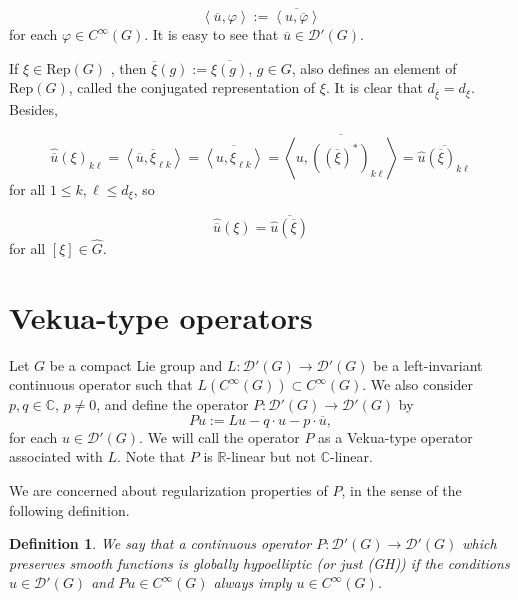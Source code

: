 \documentclass[sn-mathphys-num]{sn-jnl}%
\numberwithin{equation}{section}
\theoremstyle{thmstyleone}
\theoremstyle{thmstyletwo}
\theoremstyle{thmstylethree}
\newtheorem{definition}{Definition}[section]
\def\jp#1{{\left\langle{#1}\right\rangle}}
\begin{document}
$$\jp{\overline{u},\varphi}:= \overline{ \jp{u, \overline{\varphi}}}$$
for each $\varphi \in C^\infty(G)$. It is easy to see that $\overline{u} \in \mathcal{D}'(G)$. 

If $\xi \in \textrm{Rep}(G)$ , then $\overline{\xi}(g):=\overline{\xi(g)}$, $g \in G$, also defines an element of $\textrm{Rep}(G)$, called the conjugated representation of $\xi$. It is clear that $d_{\overline{\xi}}=d_{\xi}$.  Besides,

$$\widehat{\overline{u}}(\xi)_{k\ell}= \jp{\overline{u}, \overline{\xi}_{\ell k}} = \overline{  \jp{u, \xi_{\ell k}}}=\overline{\jp{u, ((\overline{\xi})^*)_{k \ell}}}=\overline{\widehat{u}(\overline{\xi})_{k\ell}}$$
for all $1 \leq k,\ell \leq d_\xi$, so

\begin{equation}\label{conj}
\widehat{\overline{u}}(\xi) = \overline{ \widehat{u}(\overline{\xi})}
\end{equation}
for all $[\xi] \in \widehat{G}$.


\section{Vekua-type operators}\label{Section_Vekua_operators}
Let $G$ be a compact Lie group and $L: \mathcal{D}'(G) \rightarrow \mathcal{D}'(G)$ be a left-invariant continuous operator such that $L(C^\infty(G)) \subset C^\infty(G)$. We also consider $p,q \in \mathbb{C}$, $p \neq 0$, and define the operator $P: \mathcal{D}'(G) \rightarrow \mathcal{D}'(G)$ by
\begin{equation}\label{vekua_op} 
Pu:= Lu -q\cdot u - p \cdot \overline{u},
\end{equation} 
for each $u \in \mathcal{D}'(G)$. We will call the operator $P$ as a Vekua-type operator associated with $L$. Note that $P$ is $\mathbb{R}$-linear but not $\mathbb{C}$-linear. 

We are concerned about regularization properties of $P$, in the sense of the following definition.

\begin{definition} We say that a continuous operator $P: \mathcal{D}'(G) \rightarrow \mathcal{D}'(G)$ which preserves smooth functions is globally hypoelliptic (or just (GH)) if the conditions $u \in \mathcal{D}'(G)$ and $Pu \in C^\infty(G)$ always imply $u \in C^\infty(G)$.
\end{definition}
\end{document}
